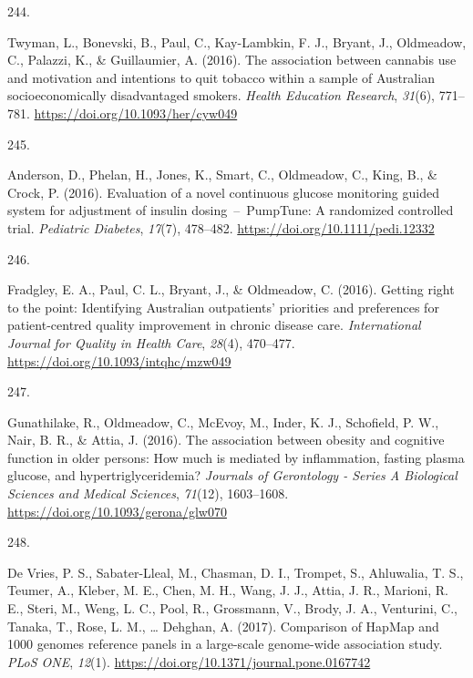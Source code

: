 \documentclass[11pt, a4paper]{awesome-cv}
\newlength{\csllabelwidth}
\newcommand{\CSLLeftMargin}[1]{\parbox[t]{\csllabelwidth}{#1}}
\newcommand{\CSLRightInline}[1]{\parbox[t]{\linewidth - \csllabelwidth}{#1}}
\begin{document}
\leavevmode\hypertarget{ref-twyman_association_2016}{}%
\CSLLeftMargin{244. }
\CSLRightInline{Twyman, L., Bonevski, B., Paul, C., Kay-Lambkin, F. J.,
Bryant, J., Oldmeadow, C., Palazzi, K., \& Guillaumier, A. (2016). The
association between cannabis use and motivation and intentions to quit
tobacco within a sample of Australian socioeconomically disadvantaged
smokers. \emph{Health Education Research}, \emph{31}(6), 771--781.
\url{https://doi.org/10.1093/her/cyw049}}

\leavevmode\hypertarget{ref-anderson_evaluation_2016}{}%
\CSLLeftMargin{245. }
\CSLRightInline{Anderson, D., Phelan, H., Jones, K., Smart, C.,
Oldmeadow, C., King, B., \& Crock, P. (2016). Evaluation of a novel
continuous glucose monitoring guided system for adjustment of insulin
dosing~--~PumpTune: A randomized controlled trial. \emph{Pediatric
Diabetes}, \emph{17}(7), 478--482.
\url{https://doi.org/10.1111/pedi.12332}}

\leavevmode\hypertarget{ref-fradgley_getting_2016}{}%
\CSLLeftMargin{246. }
\CSLRightInline{Fradgley, E. A., Paul, C. L., Bryant, J., \& Oldmeadow,
C. (2016). Getting right to the point: Identifying Australian
outpatients' priorities and preferences for patient-centred quality
improvement in chronic disease care. \emph{International Journal for
Quality in Health Care}, \emph{28}(4), 470--477.
\url{https://doi.org/10.1093/intqhc/mzw049}}

\leavevmode\hypertarget{ref-gunathilake_association_2016}{}%
\CSLLeftMargin{247. }
\CSLRightInline{Gunathilake, R., Oldmeadow, C., McEvoy, M., Inder, K.
J., Schofield, P. W., Nair, B. R., \& Attia, J. (2016). The association
between obesity and cognitive function in older persons: How much is
mediated by inflammation, fasting plasma glucose, and
hypertriglyceridemia? \emph{Journals of Gerontology - Series A
Biological Sciences and Medical Sciences}, \emph{71}(12), 1603--1608.
\url{https://doi.org/10.1093/gerona/glw070}}

\leavevmode\hypertarget{ref-de_vries_comparison_2017}{}%
\CSLLeftMargin{248. }
\CSLRightInline{De Vries, P. S., Sabater-Lleal, M., Chasman, D. I.,
Trompet, S., Ahluwalia, T. S., Teumer, A., Kleber, M. E., Chen, M. H.,
Wang, J. J., Attia, J. R., Marioni, R. E., Steri, M., Weng, L. C., Pool,
R., Grossmann, V., Brody, J. A., Venturini, C., Tanaka, T., Rose, L. M.,
\ldots{} Dehghan, A. (2017). Comparison of HapMap and 1000 genomes
reference panels in a large-scale genome-wide association study.
\emph{PLoS ONE}, \emph{12}(1).
\url{https://doi.org/10.1371/journal.pone.0167742}}
\end{document}
